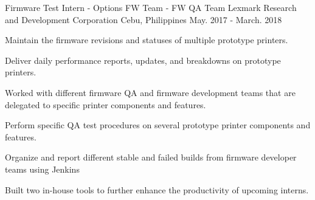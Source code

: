 

\begin{cventries}

  \cventry
    {Firmware Test Intern - Options FW Team - FW QA Team} %
    {Lexmark Research and Development Corporation } %
    {Cebu, Philippines} %
    {May. 2017 - March. 2018} %
    {
      \begin{cvitems} %
        \item {Maintain the firmware revisions and statuses of multiple prototype printers.}
        \item {Deliver daily performance reports, updates, and breakdowns on prototype printers.}
        \item {Worked with different firmware QA and firmware development teams that are delegated to specific printer components and features.}
        \item {Perform specific QA test procedures on several prototype printer components and features.}
        \item {Organize and report different stable and failed builds from firmware developer teams using Jenkins}
        \item {Built two in-house tools to further enhance the productivity of upcoming interns.}
      \end{cvitems}
    }

\end{cventries}
